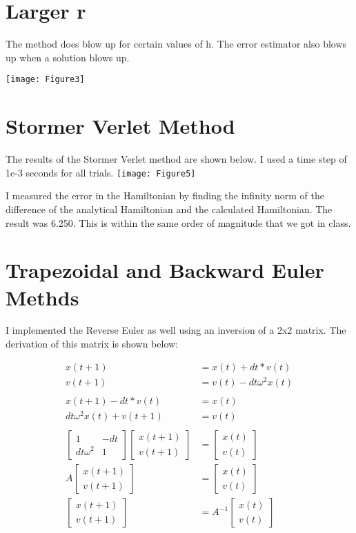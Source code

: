 \documentclass{article}
\begin{document}
\section{Larger r}


The method does blow up for certain values of h. The error estimator also blows up when a solution blows up.

\texttt{[image: Figure3]}

\section{Stormer Verlet Method}

The results of the Stormer Verlet method are shown below. I used a time step of 1e-3 seconds for all trials.
\texttt{[image: Figure5]}

I measured the error in the Hamiltonian by finding the infinity norm of the difference of the analytical Hamiltonian and the calculated Hamiltonian. The result was 6.250. This is within the same order of magnitude that we got in class.

\section{Trapezoidal and Backward Euler Methds}


I implemented the Reverse Euler as well using an inversion of a 2x2 matrix. The derivation of this matrix is shown below:

\begin{align*}
x(t+1) &= x(t) + dt * v(t)\\
v(t+1) &= v(t) - dt  \omega^2 x(t)\\
\\
x(t+1) -  dt * v(t) &= x(t)\\
dt  \omega^2 x(t) + v(t+1) &= v(t) \\
\\
\begin{bmatrix}
1 & -dt\\
dt\omega^2 & 1 
\end{bmatrix}
\begin{bmatrix}
x(t+1) \\ v(t+1)
\end{bmatrix}
&= \begin{bmatrix}
x(t) \\ v(t)
\end{bmatrix}\\
A
\begin{bmatrix}
x(t+1) \\ v(t+1)
\end{bmatrix}
&= \begin{bmatrix}
x(t) \\ v(t)
\end{bmatrix}\\
\begin{bmatrix}
x(t+1) \\ v(t+1)
\end{bmatrix}
&= A^{-1} \begin{bmatrix}
x(t) \\ v(t)
\end{bmatrix}
\end{align*}
\end{document}
